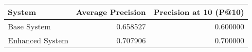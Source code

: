 \begin{tabular}{lrr}
\toprule
System & Average Precision & Precision at 10 (P@10) \\
\midrule
Base System & 0.658527 & 0.600000 \\
Enhanced System & 0.707906 & 0.700000 \\
\bottomrule
\end{tabular}
